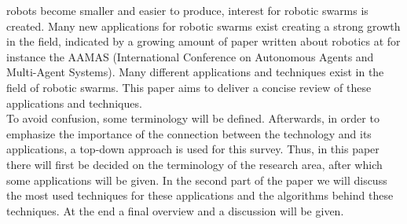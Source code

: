  robots become smaller and easier to produce, interest for robotic swarms is created. Many new applications for robotic swarms exist creating a strong growth in the field, indicated by a growing amount of paper written about robotics at for instance the AAMAS (International Conference on Autonomous Agents and Multi-Agent Systems). \cite{Amigoni2014} Many different applications and techniques exist in the field of robotic swarms. This paper aims to deliver a concise review of these applications and techniques. \\

To avoid confusion, some terminology will be defined. Afterwards, in order to emphasize the importance of the connection between the technology and its applications, a top-down approach is used for this survey. Thus, in this paper there will first be decided on the terminology of the research area, after which some applications will be given. In the second part of the paper we will discuss the most used techniques for these applications and the algorithms behind these techniques. At the end a final overview and a discussion will be given.
